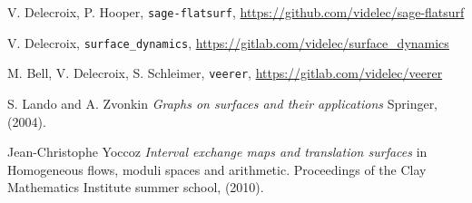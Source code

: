 \documentclass{article}
\def\cA{\mathcal{A}}
\def\cE{\mathcal{E}}
\begin{document}
%
%
%
%


%
%
%
%

\begin{thebibliography}{sage-flatsurf}

V. Delecroix, P. Hooper,
\texttt{sage-flatsurf},
\url{https://github.com/videlec/sage-flatsurf}

V. Delecroix,
\texttt{surface\_dynamics},
\url{https://gitlab.com/videlec/surface_dynamics}

M. Bell, V. Delecroix, S. Schleimer,
\texttt{veerer},
\url{https://gitlab.com/videlec/veerer}

S. Lando and A. Zvonkin
\textit{Graphs on surfaces and their applications}
Springer, (2004).

Jean-Christophe Yoccoz
\textit{Interval exchange maps and translation surfaces}
in Homogeneous flows, moduli spaces and arithmetic.
Proceedings of the Clay Mathematics Institute summer school,
(2010).
\end{thebibliography}
\end{document}
